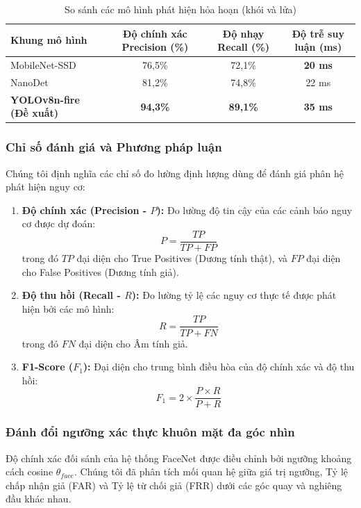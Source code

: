 \documentclass[12pt,a4paper]{article}
\begin{document}
\begin{table}[h]
    \centering
    \caption{So sánh các mô hình phát hiện hỏa hoạn (khói và lửa)}
    \label{tab:fire_comparison}
    \begin{tabular}{lccc}
        \toprule
        \textbf{Khung mô hình} & \textbf{Độ chính xác Precision (\%)} & \textbf{Độ nhạy Recall (\%)} & \textbf{Độ trễ suy luận (ms)} \\
        \midrule
        MobileNet-SSD & 76,5\% & 72,1\% & \textbf{20 ms} \\
        NanoDet & 81,2\% & 74,8\% & 22 ms \\
        \textbf{YOLOv8n-fire (Đề xuất)} & \textbf{94,3\%} & \textbf{89,1\%} & \textbf{35 ms} \\
        \bottomrule
    \end{tabular}
\end{table}

\subsubsection{Chỉ số đánh giá và Phương pháp luận}
Chúng tôi định nghĩa các chỉ số đo lường định lượng dùng để đánh giá phân hệ phát hiện nguy cơ:
\begin{enumerate}
    \item \textbf{Độ chính xác (Precision - $P$):} Đo lường độ tin cậy của các cảnh báo nguy cơ được dự đoán:
    \begin{equation}
        P = \frac{TP}{TP + FP}
    \end{equation}
    trong đó $TP$ đại diện cho True Positives (Dương tính thật), và $FP$ đại diện cho False Positives (Dương tính giả).
    
    \item \textbf{Độ thu hồi (Recall - $R$):} Đo lường tỷ lệ các nguy cơ thực tế được phát hiện bởi các mô hình:
    \begin{equation}
        R = \frac{TP}{TP + FN}
    \end{equation}
    trong đó $FN$ đại diện cho Âm tính giả.
    
    \item \textbf{F1-Score ($F_1$):} Đại diện cho trung bình điều hòa của độ chính xác và độ thu hồi:
    \begin{equation}
        F_1 = 2 \times \frac{P \times R}{P + R}
    \end{equation}
\end{enumerate}

\subsubsection{Đánh đổi ngưỡng xác thực khuôn mặt đa góc nhìn}
Độ chính xác đối sánh của hệ thống FaceNet được điều chỉnh bởi ngưỡng khoảng cách cosine $\theta_{face}$. Chúng tôi đã phân tích mối quan hệ giữa giá trị ngưỡng, Tỷ lệ chấp nhận giả (FAR) và Tỷ lệ từ chối giả (FRR) dưới các góc quay và nghiêng đầu khác nhau.
\end{document}
